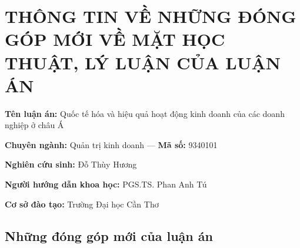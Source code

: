 \documentclass[
  a4paper,
  13pt]{extarticle}
\author{}
\date{}
\begin{document}
\hypertarget{thuxf4ng-tin-vux1ec1-nhux1eefng-ux111uxf3ng-guxf3p-mux1edbi-vux1ec1-mux1eb7t-hux1ecdc-thuux1eadt-luxfd-luux1eadn-cux1ee7a-luux1eadn-uxe1n}{%
\section*{THÔNG TIN VỀ NHỮNG ĐÓNG GÓP MỚI VỀ MẶT HỌC THUẬT, LÝ LUẬN CỦA
LUẬN
ÁN}\label{thuxf4ng-tin-vux1ec1-nhux1eefng-ux111uxf3ng-guxf3p-mux1edbi-vux1ec1-mux1eb7t-hux1ecdc-thuux1eadt-luxfd-luux1eadn-cux1ee7a-luux1eadn-uxe1n}}

\textbf{Tên luận án:} Quốc tế hóa và hiệu quả hoạt động kinh doanh của
các doanh nghiệp ở châu Á

\textbf{Chuyên ngành:} Quản trị kinh doanh --- \textbf{Mã số:} 9340101

\textbf{Nghiên cứu sinh:} Đỗ Thùy Hương

\textbf{Người hướng dẫn khoa học:} PGS.TS. Phan Anh Tú

\textbf{Cơ sở đào tạo:} Trường Đại học Cần Thơ

\hypertarget{nhux1eefng-ux111uxf3ng-guxf3p-mux1edbi-cux1ee7a-luux1eadn-uxe1n}{%
\subsection*{Những đóng góp mới của luận
án}\label{nhux1eefng-ux111uxf3ng-guxf3p-mux1edbi-cux1ee7a-luux1eadn-uxe1n}}
\end{document}
